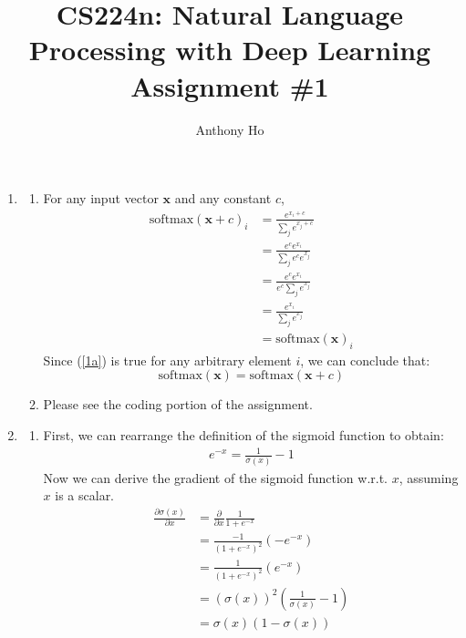 \documentclass[10pt,reqno]{amsart}
\begin{document}
\title{CS224n: Natural Language Processing with Deep Learning\\Assignment \#1}
\author{Anthony Ho}
\maketitle


\newcommand{\f}{\frac}
\newcommand{\pd}[1]{\frac{\partial}{\partial #1}}
\newcommand{\pdd}[2]{\frac{\partial #1}{\partial #2}}
\newcommand{\softmax}{\text{softmax}}


\renewcommand{\labelenumi}{\arabic{enumi}.}
\begin{enumerate}[topsep=0pt,itemsep=3ex,partopsep=1ex,parsep=1ex]


\item
  \begin{enumerate}[itemsep=2ex]
  \item
    For any input vector $\bm{x}$ and any constant $c$,
    \begin{align}
      \softmax(\bm{x} + c)_i
      &= \f{e^{x_i + c}}{\sum_j e^{x_j + c}} \nonumber \\
      &= \f{e^c e^{x_i}}{\sum_j e^c e^{x_j}} \nonumber \\
      &= \f{e^c e^{x_i}}{e^c \sum_j e^{x_j}} \nonumber \\
      &= \f{e^{x_i}}{\sum_j e^{x_j}} \nonumber \\
      &= \softmax(\bm{x})_i \label{1a}
    \end{align}
    Since (\ref{1a}) is true for any arbitrary element $i$,
    we can conclude that:
    \begin{equation*}
      \softmax(\bm{x}) = \softmax(\bm{x} + c)
    \end{equation*}
    
  \item Please see the coding portion of the assignment.
  \end{enumerate}


\item
  \begin{enumerate}[itemsep=2ex]
  \item 
    First, we can rearrange the definition of the sigmoid function to obtain:
    \begin{align*}
      e^{-x} = \f{1}{\sigma(x)} - 1
    \end{align*}
    Now we can derive the gradient of the sigmoid function w.r.t. $x$,
    assuming $x$ is a scalar. 
    \begin{align*}
      \pdd{\sigma(x)}{x}
      &= \pd{x} \f{1}{1 + e^{-x}} \\
      &= \f{-1}{(1 + e^{-x})^2} \left( - e^{-x} \right) \\
      &= \f{1}{(1 + e^{-x})^2} \left( e^{-x} \right) \\
      &= \left( \sigma(x) \right)^2 \left( \f{1}{\sigma(x)} - 1 \right) \\
      &= \sigma(x) \left( 1 - \sigma(x) \right)
    \end{align*}


\end{enumerate}
\end{enumerate}
\end{document}
